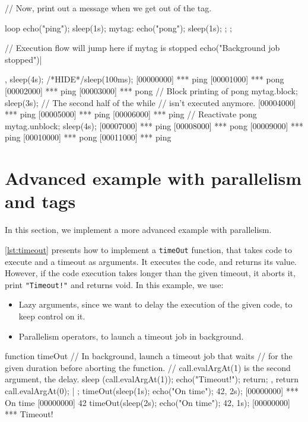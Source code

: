 \documentclass[openright,twoside,12pt]{report}
\begin{document}
\begin{urbiscript}[caption=Blocking chunks of code, label=lst:block]
// Now, print out a message when we get out of the tag.
{
  loop
  {
    echo("ping"); sleep(1s);
    mytag: { echo("pong"); sleep(1s); };
  };

  // Execution flow will jump here if mytag is stopped
  echo("Background job stopped")|
},
sleep(4s);
/*HIDE*/sleep(100ms);
[00000000] *** ping
[00001000] *** pong
[00002000] *** ping
[00003000] *** pong
// Block printing of pong
mytag.block;
sleep(3s);
// The second half of the while
// isn't executed anymore.
[00004000] *** ping
[00005000] *** ping
[00006000] *** ping
// Reactivate pong
mytag.unblock;
sleep(4s);
[00007000] *** ping
[00008000] *** pong
[00009000] *** ping
[00010000] *** pong
[00011000] *** ping
\end{urbiscript}

\section{Advanced example with parallelism and tags}

In this section, we implement a more advanced example with
parallelism.

\autoref{lst:timeout} presents how to implement a \texttt{timeOut}
function, that takes code to execute and a timeout as arguments. It
executes the code, and returns its value. However, if the code
execution takes longer than the given timeout, it aborts it, print
\lstinline|"Timeout!"| and returns void. In this example, we use:

\begin{itemize}
\item Lazy arguments, since we want to delay the execution of the
  given code, to keep control on it.
\item Parallelism operators, to launch a timeout job in background.
\end{itemize}

\begin{urbiscript}[caption=Implementing a timeout method, label=lst:timeout]
function timeOut
{
  // In background, launch a timeout job that waits
  // for the given duration before aborting the function.
  // call.evalArgAt(1) is the second argument, the delay.
  {
    sleep (call.evalArgAt(1));
    echo("Timeout!");
    return;
  },
  return call.evalArgAt(0);
} | {};
timeOut({sleep(1s); echo("On time"); 42}, 2s);
[00000000] *** On time
[00000000] 42
timeOut({sleep(2s); echo("On time"); 42}, 1s);
[00000000] *** Timeout!
\end{urbiscript}
\end{document}
